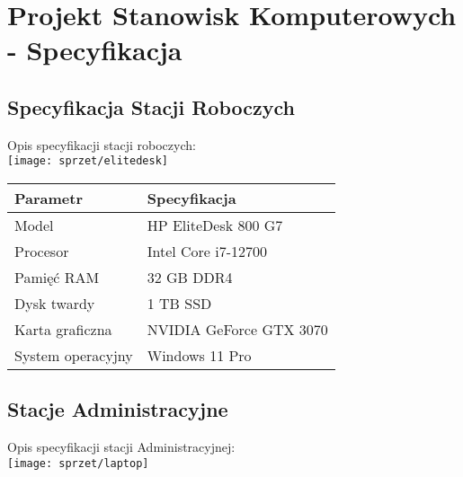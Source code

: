 \section{Projekt Stanowisk Komputerowych - Specyfikacja}

\subsection{Specyfikacja Stacji Roboczych}

    Opis specyfikacji stacji roboczych:\\
    \texttt{[image: sprzet/elitedesk]}
    \begin{flushleft}
        \begin{table}[h]
            \renewcommand{\arraystretch}{1.5}
            \begin{tabular}{|l|l|}
            \hline
                \textbf{Parametr} & \textbf{Specyfikacja} \\
            \hline
                Model & HP EliteDesk 800 G7 \\
                Procesor & Intel Core i7-12700 \\
                Pamięć RAM & 32 GB DDR4 \\
                Dysk twardy & 1 TB SSD \\
                Karta graficzna & NVIDIA GeForce GTX 3070 \\
                System operacyjny & Windows 11 Pro \\
            \hline
            \end{tabular}
        \end{table}  
    \end{flushleft}

\subsection{Stacje Administracyjne}

    Opis specyfikacji stacji Administracyjnej:\\
    \texttt{[image: sprzet/laptop]}


